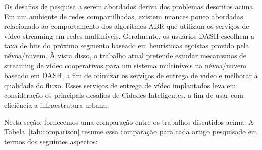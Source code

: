 Os desafios de pesquisa a serem abordados deriva dos problemas descritos acima.
Em um ambiente de redes compartilhadas, existem nuances pouco abordadas relacionado ao comportamento dos algoritmos ABR que utilizam os serviços de vídeo streaming em redes multiníveis. Geralmente, os usuários DASH escolhem a taxa de bits do próximo segmento baseado em heurísticas egoístas provido pela névoa/nuvem. 
À vista disso, o trabalho atual pretende estudar mecanismos de streaming de vídeo cooperativos para um sistema multiníveis na névoa/nuvem baseado em DASH, a fim de otimizar os serviços de entrega de vídeo e melhorar a qualidade do fluxo. 
Esses serviços de entrega de vídeo implantados leva em consideração os principais desafios de Cidades Inteligentes, a fim de usar com eficiência a infraestrutura urbana. 



Nesta seção, fornecemos uma comparação entre os trabalhos discutidos acima.
A Tabela~\ref{tab:comparison} resume essa comparação para cada artigo pesquisado em termos dos seguintes aspectos:

